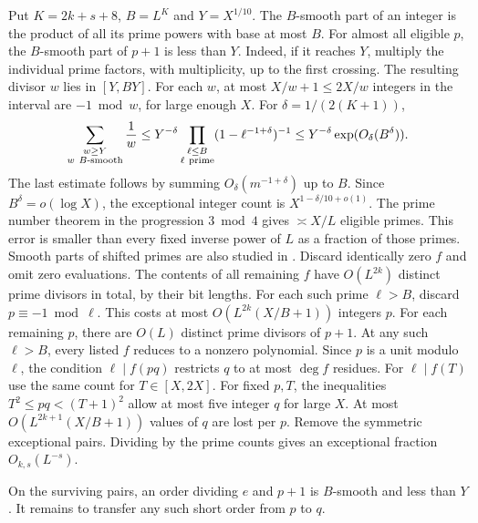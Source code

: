 Put $K=2k+s+8$, $B=L^K$ and $Y=X^{1/10}$. The $B$-smooth part of an integer is the product of all its prime powers with base at most $B$. For almost all eligible $p$, the $B$-smooth part of $p+1$ is less than $Y$. Indeed, if it reaches $Y$, multiply the individual prime factors, with multiplicity, up to the first crossing. The resulting divisor $w$ lies in $[Y,BY]$. For each $w$, at most $X/w+1\le2X/w$ integers in the interval are $-1\bmod w$, for large enough $X$. For $\delta=1/(2(K+1))$,
\[
 \sum_{\substack{w\ge Y\\w\ B\text{-smooth}}}\frac1w
 \le Y^{-\delta}\prod_{\substack{\ell\le B\\\ell\ {\rm prime}}}(1-\ell^{-1+\delta})^{-1}
 \le Y^{-\delta}\exp(O_\delta(B^\delta)).
\]
The last estimate follows by summing $O_\delta(m^{-1+\delta})$ up to $B$. Since $B^\delta=o(\log X)$, the exceptional integer count is $X^{1-\delta/10+o(1)}$. The prime number theorem in the progression $3\bmod4$ gives $\asymp X/L$ eligible primes. This error is smaller than every fixed inverse power of $L$ as a fraction of those primes. Smooth parts of shifted primes are also studied in .
\newpage
{}
Discard identically zero $f$ and omit zero evaluations. The contents of all remaining $f$ have $O(L^{2k})$ distinct prime divisors in total, by their bit lengths. For each such prime $\ell>B$, discard $p\equiv-1\bmod\ell$. This costs at most $O(L^{2k}(X/B+1))$ integers $p$. For each remaining $p$, there are $O(L)$ distinct prime divisors of $p+1$. At any such $\ell>B$, every listed $f$ reduces to a nonzero polynomial. Since $p$ is a unit modulo $\ell$, the condition $\ell\mid f(pq)$ restricts $q$ to at most $\deg f$ residues. For $\ell\mid f(T)$ use the same count for $T\in[X,2X]$. For fixed $p,T$, the inequalities $T^2\le pq<(T+1)^2$ allow at most five integer $q$ for large $X$. At most $O(L^{2k+1}(X/B+1))$ values of $q$ are lost per $p$. Remove the symmetric exceptional pairs. Dividing by the prime counts gives an exceptional fraction $O_{k,s}(L^{-s})$.

On the surviving pairs, an order dividing $e$ and $p+1$ is $B$-smooth and less than $Y$. It remains to transfer any such short order from $p$ to $q$.

